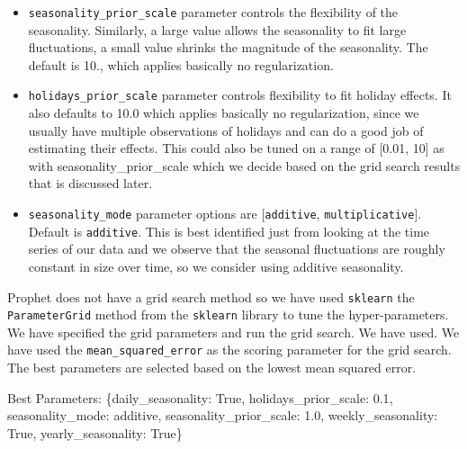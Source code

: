 \documentclass[mstat,12pt]{unswthesis}
\newenvironment{Shaded}{\begin{snugshade}}{\end{snugshade}}
\newcommand{\FloatTok}[1]{\textcolor[rgb]{0.00,0.00,0.81}{#1}}
\newcommand{\NormalTok}[1]{#1}
\newcommand{\StringTok}[1]{\textcolor[rgb]{0.31,0.60,0.02}{#1}}
\newcommand{\VariableTok}[1]{\textcolor[rgb]{0.00,0.00,0.00}{#1}}
\begin{document}
\begin{itemize}
\item
  \texttt{seasonality\_prior\_scale} parameter controls the flexibility
  of the seasonality. Similarly, a large value allows the seasonality to
  fit large fluctuations, a small value shrinks the magnitude of the
  seasonality. The default is 10., which applies basically no
  regularization.
\item
  \texttt{holidays\_prior\_scale} parameter controls flexibility to fit
  holiday effects. It also defaults to 10.0 which applies basically no
  regularization, since we usually have multiple observations of
  holidays and can do a good job of estimating their effects. This could
  also be tuned on a range of {[}0.01, 10{]} as with
  seasonality\_prior\_scale which we decide based on the grid search
  results that is discussed later.
\item
  \texttt{seasonality\_mode} parameter options are
  {[}\texttt{\textquotesingle{}additive\textquotesingle{}},
  \texttt{\textquotesingle{}multiplicative\textquotesingle{}}{]}.
  Default is \texttt{\textquotesingle{}additive\textquotesingle{}}. This
  is best identified just from looking at the time series of our data
  and we observe that the seasonal fluctuations are roughly constant in
  size over time, so we consider using additive seasonality.
\end{itemize}

Prophet does not have a grid search method so we have used
\texttt{sklearn} the \texttt{ParameterGrid} method from the
\texttt{sklearn} library to tune the hyper-parameters. We have specified
the grid parameters and run the grid search. We have used. We have used
the \texttt{mean\_squared\_error} as the scoring parameter for the grid
search. The best parameters are selected based on the lowest mean
squared error.

\begin{Shaded}
\begin{Highlighting}[]
\NormalTok{Best Parameters: \{}\StringTok{\textquotesingle{}daily\_seasonality\textquotesingle{}}\NormalTok{: }\VariableTok{True}\NormalTok{, }
                  \StringTok{\textquotesingle{}holidays\_prior\_scale\textquotesingle{}}\NormalTok{: }\FloatTok{0.1}\NormalTok{, }
                  \StringTok{\textquotesingle{}seasonality\_mode\textquotesingle{}}\NormalTok{: }\StringTok{\textquotesingle{}additive\textquotesingle{}}\NormalTok{, }
                  \StringTok{\textquotesingle{}seasonality\_prior\_scale\textquotesingle{}}\NormalTok{: }\FloatTok{1.0}\NormalTok{, }
                  \StringTok{\textquotesingle{}weekly\_seasonality\textquotesingle{}}\NormalTok{: }\VariableTok{True}\NormalTok{, }
                  \StringTok{\textquotesingle{}yearly\_seasonality\textquotesingle{}}\NormalTok{: }\VariableTok{True}\NormalTok{\}}
\end{Highlighting}
\end{Shaded}
\end{document}
